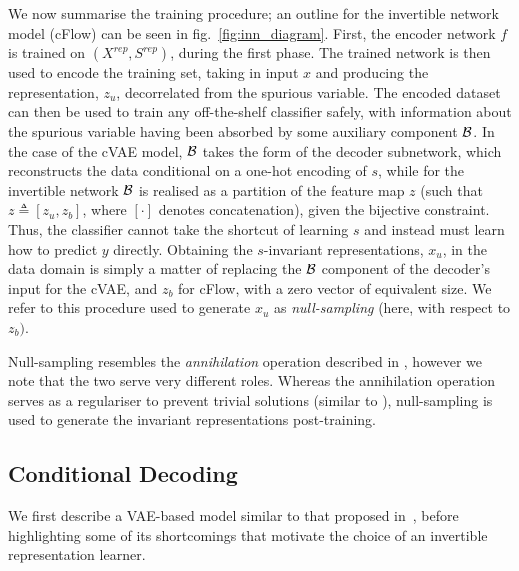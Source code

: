 We now summarise the training procedure; an outline for the invertible network model (cFlow) can be
seen in fig.~\ref{fig:inn_diagram}.
%
First, the encoder network $f$ is trained on \( (X^{rep}, S^{rep}) \), during the first
phase.
%
The trained network is then used to encode the training set, taking in input $x$ and producing the
representation, $z_u$, decorrelated from the spurious variable.
%
The encoded dataset can then be used to train any off-the-shelf classifier safely, with information
about the spurious variable having been absorbed by some auxiliary component ${\mathcal{B}}$.
%
In the case of the \acf{cVAE} model, ${\mathcal{B}}$ takes the form of the decoder subnetwork, which
reconstructs the data conditional on a one-hot encoding of $s$, while for the invertible network
${\mathcal{B}}$ is realised as a partition of the feature map $z$ (such that $z \triangleq [z_u, z_b]$,
where \( [\cdot] \) denotes concatenation), given the bijective constraint.
%
Thus, the classifier cannot take the shortcut of learning $s$ and instead must learn how to predict
$y$ directly.
%
Obtaining the $s$-invariant representations, $x_u$, in the data domain is simply a matter of
replacing the ${\mathcal{B}}$ component of the decoder's input for the cVAE, and $z_b$ for
cFlow, with a zero vector of equivalent size.
%
We refer to this procedure used to generate $x_u$ as \emph{null-sampling} (here, with respect
to $z_b)$.

Null-sampling resembles the \emph{annihilation} operation described in \citet{xiao2017dna}, however
we note that the two serve very different roles.  
%
Whereas the annihilation operation serves as a regulariser to prevent trivial solutions (similar to
\cite{jaiswal2018unsupervised}), null-sampling is used to generate the invariant representations
post-training.

\subsection{Conditional Decoding}%
%
\label{conddec}
\noindent We first describe a VAE-based model similar to that proposed
in~\citet{madras2018learning}, before highlighting some of its shortcomings that motivate the
choice of an invertible representation learner.

